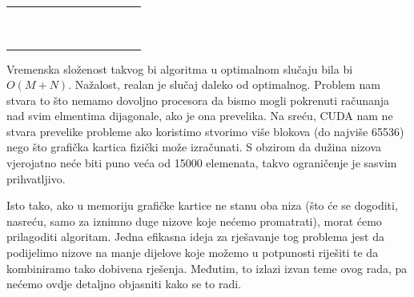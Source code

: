 \documentclass[times, utf8, zavrsni]{fer}
\begin{document}
\begin{tabularx}{240pt}{|R|R|R|R|R|R|R|R|R|R|R|R|}
 \hline
  &  &  &  &  &  &  &  &  &   &  &  \\ \hline
  &  &  &  &  &  &  &  &   &  &  &  \\ \hline
  &  &  &  &  &  &  &   &  &  &  &  \\ \hline
  &  &  &  &  &  &   &  &  &  &  &  \\ \hline
  &  &  &  &  &   &  &  &  &  &  &  \\ \hline
  &  &  &  &   &  &  &  &  &  &  &  \\ \hline
  &  &  &   &  &  &  &  &  &  &  &  \\ \hline
  &  &   &  &  &  &  &  &  &  &  &  \\ \hline
  &   &  &  &  &  &  &  &  &  &  &  \\ \hline
   &  &  &  &  &  &  &  &  &  &  &  \\ \hline
  &  &  &  &  &  &  &  &  &  &  &  \\ \hline
\end{tabularx}


Vremenska složenost takvog bi algoritma u optimalnom slučaju bila
bi $O(M+N)$. Nažalost, realan je slučaj daleko od optimalnog. 
Problem nam stvara to što nemamo dovoljno procesora da bismo
mogli pokrenuti računanja nad svim elmentima dijagonale, ako je
ona prevelika. Na sreću, CUDA nam ne stvara prevelike probleme
ako koristimo stvorimo više blokova (do najviše 65536) nego što
grafička kartica fizički može izračunati. S obzirom da dužina
nizova vjerojatno neće biti puno veća od 15000 elemenata, 
takvo ograničenje je sasvim prihvatljivo.

Isto tako, ako u memoriju grafičke kartice ne stanu
oba niza (što će se dogoditi, nasreću, samo za iznimno
duge nizove koje nećemo promatrati), morat ćemo prilagoditi
algoritam. Jedna efikasna ideja
za rješavanje tog problema jest da podijelimo nizove na manje
dijelove koje možemo u potpunosti riješiti te da kombiniramo
tako dobivena rješenja. 
Međutim, to izlazi izvan teme ovog rada, pa nećemo
ovdje detaljno objasniti kako se to radi.
\end{document}
